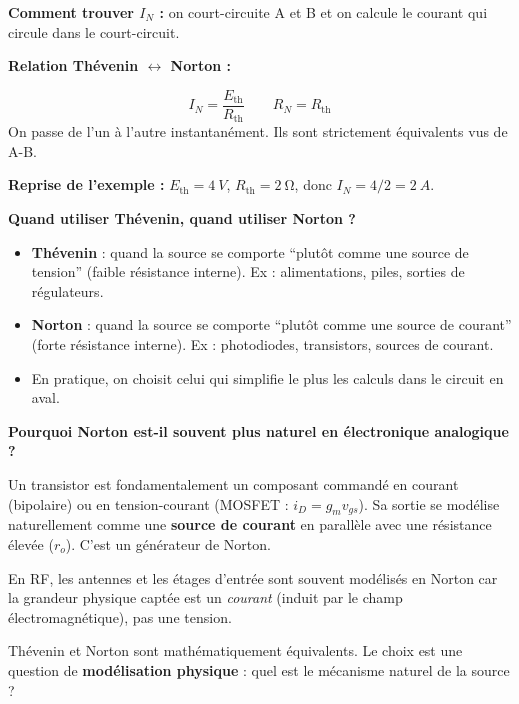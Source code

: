\documentclass[12pt,a4paper,twoside]{book}
\begin{document}
\textbf{Comment trouver $I_N$ :} on court-circuite A et B et on calcule le courant qui circule dans le court-circuit.

\textbf{Relation Thévenin $\leftrightarrow$ Norton :}

\begin{formule}
\[
\boxed{I_N = \frac{E_{\text{th}}}{R_{\text{th}}}} \qquad \boxed{R_N = R_{\text{th}}}
\]
On passe de l'un à l'autre instantanément. Ils sont strictement équivalents vus de A-B.
\end{formule}

\textbf{Reprise de l'exemple :} $E_{\text{th}} = \SI{4}{V}$, $R_{\text{th}} = \SI{2}{\ohm}$, donc $I_N = 4/2 = \SI{2}{A}$.

\begin{pratique}
\textbf{Quand utiliser Thévenin, quand utiliser Norton ?}
\begin{itemize}[nosep]
\item \textbf{Thévenin} : quand la source se comporte ``plutôt comme une source de tension'' (faible résistance interne). Ex : alimentations, piles, sorties de régulateurs.
\item \textbf{Norton} : quand la source se comporte ``plutôt comme une source de courant'' (forte résistance interne). Ex : photodiodes, transistors, sources de courant.
\item En pratique, on choisit celui qui simplifie le plus les calculs dans le circuit en aval.
\end{itemize}
\end{pratique}

\begin{intuition}
\textbf{Pourquoi Norton est-il souvent plus naturel en électronique analogique ?}

Un transistor est fondamentalement un composant commandé en courant (bipolaire) ou en tension-courant (MOSFET : $i_D = g_m v_{gs}$). Sa sortie se modélise naturellement comme une \textbf{source de courant} en parallèle avec une résistance élevée ($r_o$). C'est un générateur de Norton.

En RF, les antennes et les étages d'entrée sont souvent modélisés en Norton car la grandeur physique captée est un \textit{courant} (induit par le champ électromagnétique), pas une tension.

Thévenin et Norton sont mathématiquement équivalents. Le choix est une question de \textbf{modélisation physique} : quel est le mécanisme naturel de la source ?
\end{intuition}
\end{document}
